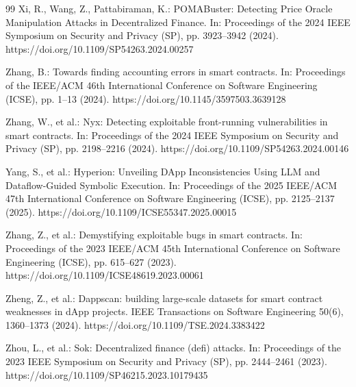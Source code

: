 \documentclass[pdflatex,sn-basic]{sn-jnl}%
\theoremstyle{thmstyleone}%
\theoremstyle{thmstyletwo}%
\theoremstyle{thmstylethree}%
\begin{document}
\begin{thebibliography}{99}
Xi, R., Wang, Z., Pattabiraman, K.: POMABuster: Detecting Price Oracle Manipulation Attacks in Decentralized Finance. In: Proceedings of the 2024 IEEE Symposium on Security and Privacy (SP), pp. 3923--3942 (2024). https://doi.org/10.1109/SP54263.2024.00257

Zhang, B.: Towards finding accounting errors in smart contracts. In: Proceedings of the IEEE/ACM 46th International Conference on Software Engineering (ICSE), pp. 1--13 (2024). https://doi.org/10.1145/3597503.3639128

Zhang, W., et al.: Nyx: Detecting exploitable front-running vulnerabilities in smart contracts. In: Proceedings of the 2024 IEEE Symposium on Security and Privacy (SP), pp. 2198--2216 (2024). https://doi.org/10.1109/SP54263.2024.00146

Yang, S., et al.: Hyperion: Unveiling DApp Inconsistencies Using LLM and Dataflow-Guided Symbolic Execution. In: Proceedings of the 2025 IEEE/ACM 47th International Conference on Software Engineering (ICSE), pp. 2125--2137 (2025). https://doi.org/10.1109/ICSE55347.2025.00015

Zhang, Z., et al.: Demystifying exploitable bugs in smart contracts. In: Proceedings of the 2023 IEEE/ACM 45th International Conference on Software Engineering (ICSE), pp. 615--627 (2023). https://doi.org/10.1109/ICSE48619.2023.00061

Zheng, Z., et al.: Dappscan: building large-scale datasets for smart contract weaknesses in dApp projects. IEEE Transactions on Software Engineering 50(6), 1360--1373 (2024). https://doi.org/10.1109/TSE.2024.3383422

Zhou, L., et al.: Sok: Decentralized finance (defi) attacks. In: Proceedings of the 2023 IEEE Symposium on Security and Privacy (SP), pp. 2444--2461 (2023). https://doi.org/10.1109/SP46215.2023.10179435

\end{thebibliography}
\end{document}
